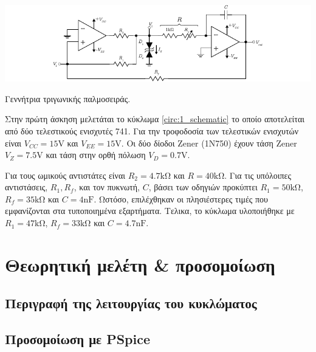 \begin{center}
	\begin{circuitfig}[H]
		\includegraphics[width=14cm]{circuits/micro3_lab1.pdf}
		\caption{Γεννήτρια τριγωνικής παλμοσειράς.}
		\label{circ:1_schematic}
	\end{circuitfig}
\end{center}
\vspace*{-1cm}

Στην πρώτη άσκηση μελετάται το κύκλωμα \ref{circ:1_schematic} το οποίο αποτελείται από δύο τελεστικούς ενισχυτές 741. Για την τροφοδοσία των τελεστικών ενισχυτών είναι $V_{CC}=15\unit{\volt}$ και $V_{EE}=15\unit{\volt}$. Οι δύο δίοδοι Zener (1N750) έχουν τάση Zener $V_Z=7.5\unit{\volt}$ και τάση στην ορθή πόλωση $V_D=0.7\unit{\volt}$.\par
Για τους ωμικούς αντιστάτες είναι $R_2=4.7\unit{\kilo\ohm}$ και $R=40\unit{\kilo\ohm}$. Για τις υπόλοιπες αντιστάσεις, $R_1,R_f$, και τον πυκνωτή, $C$, βάσει των οδηγιών προκύπτει $R_1=50\unit{\kilo\ohm}$, $R_f=35\unit{\kilo\ohm}$ και $C=4\unit{\nano\farad}$. Ωστόσο, επιλέχθηκαν οι πλησιέστερες τιμές που εμφανίζονται στα τυποποιημένα εξαρτήματα. Τελικα, το κύκλωμα υλοποιήθηκε με $R_1=47\unit{\kilo\ohm}$, $R_f=33\unit{\kilo\ohm}$ και $C=4.7\unit{\nano\farad}$.\par

\section{Θεωρητική μελέτη \& προσομοίωση}

	\subsection{Περιγραφή της λειτουργίας του κυκλώματος}
		

	\subsection{Προσομοίωση με PSpice}
		



